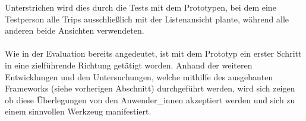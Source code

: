\documentclass[Bachelorarbeit.tex]{subfiles}
\begin{document}
Unterstrichen wird dies durch die Tests mit dem Prototypen, bei dem eine Testperson alle Trips ausschließlich mit der Listenansicht plante, während alle anderen beide Ansichten verwendeten. \\
\\[1.5cm]
Wie in der Evaluation bereits angedeutet, ist mit dem Prototyp ein erster Schritt in eine zielführende Richtung getätigt worden.
Anhand der weiteren Entwicklungen und den Untersuchungen, welche mithilfe des ausgebauten Frameworks (siehe vorherigen Abschnitt) durchgeführt werden, wird sich zeigen ob diese Überlegungen von den Anwender\_innen akzeptiert werden und sich zu einem sinnvollen Werkzeug manifestiert.
\end{document}
